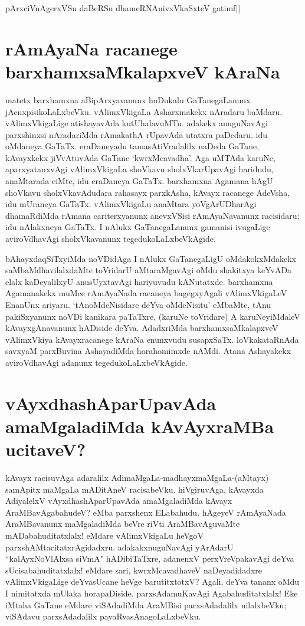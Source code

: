 \begin{shloka}
pArxciVnAgerxVSu daBeRSu dhameRNAnivxVkaSxteV gatimf||\label{204a}
\end{shloka}

\section*{rAmAyaNa racanege barxhamxsaMkalapxveV kAraNa} 

matetx barxhamxna aBipArxyavanunx huDukalu GaTanegaLanunx jAcnxpisikoLaLxbeVku. vAlimxVkigaLa Asharxmakekx nAradaru baMdaru. vAlimxVkigaLige atishayavAda kutUhalavuMTu. adakekx anuguNavAgi parxshinxsi nAradariMda rAmakathA rUpavAda utatxra paDedaru. idu oMdaneya GaTaTx. eraDaneyadu tamasAtiVradalilx naDeda GaTane, kAvayxkekx jiVvAtuvAda GaTane `kwrxMcavadha'. Aga uMTAda karuNe, aparxyatanxvAgi vAlimxVkigaLa shoVkavu sholxVkarUpavAgi haridudu, anaMtarada ciMte, idu eraDaneya GaTaTx. barxhamxna Agamana hAgU shoVkavu sholxVkavAdudara rahasayx parxkAsha, kAvayx racanege AdeVsha, idu mUraneya GaTaTx. vAlimxVkigaLu anaMtara yoVgArUDharAgi dhamaRdiMda rAmana cariterxyanunx anevxVSisi rAmAyaNavanunx racisidaru; idu nAlakxneya GaTaTx. I nAlukx GaTanegaLanunx gamanisi ivugaLige aviroVdhavAgi sholxVkavanunx tegedukoLaLxbeVkAgide. 


bAhayxdaqSiTxyiMda noVDidAga I nAlukx GaTanegaLigU oMdakokxMdakekx saMbaMdhavilalxdaMte toVridarU aMtaraMgavAgi oMdu shakitxya keYvADa elalx kaDeyalilxyU anusUyxtavAgi hariyuvudu kANutatxde. barxhamxna Agamanakekx muMce rAmAyaNada racaneya bagegxyAgali vAlimxVkigaLeV EnanUnx ariyaru. `tAnoMdeNisidare deYva oMdeNisitu' eMbaMte, tAnu pakiSxyanunx noVDi kanikara paTaTxre, (karuNe toVridare) A karuNeyiMdaleV kAvayxgAnavanunx hADiside deYva. AdadxriMda barxhamxsaMkalapxveV vAlimxVkiya kAvayxracanege kAraNa enunxvudu susapxSaTx. loVkakataRnAda savxyaM parxBuvina AshayadiMda horahomimxde nAMdi. Atana Ashayakekx aviroVdhavAgi adanunx tegedukoLaLxbeVkAgide. 

\section*{vAyxdhashAparUpavAda amaMgaladiMda kAvAyxraMBa ucitaveV?} 

kAvayx racisuvAga adaralilx AdimaMgaLa-madhayxmaMgaLa-(aMtayx) samApitx maMgaLa mADitAneV racisabeVku. hiVgiruvAga, kAvayxda AdiyalelxV vAyxdhashAparUpavAda amaMgaladiMda kAvayx AraMBavAgabahudeV? eMba parxshenx ELabahudu. hAgeyeV rAmAyaNada AraMBavanunx maMgaladiMda beVre riVti AraMBavAguvaMte mADabahuditatxlalx! eMdare vAlimxVkigaLu heVgoV parxshAMtacitatxrAgidadxru. adakakxnuguNavAgi yArAdarU ``kalAyxNoVlAlxsa siVmA"\label{206} hADibiTaTxre, adanenxV perxVreVpakavAgi deYva sUcisabahuditatxlalx! eMdare sari, kwrxMcavadhaveV naDeyadidadxre vAlimxVkigaLige deYvasUcane heVge barutitxtotxV? Agali, deYva tananx oMdu I nimitatxda mUlaka horapaDiside. parxsAdamuKavAgi Agabahuditatxlalx! Eke iMtaha GaTane eMdare viSAdadiMda AraMBisi parxsAdadalilx nilalxbeVku; viSAdavu parxsAdadalilx payaRvasAnagoLaLxbeVku. 

